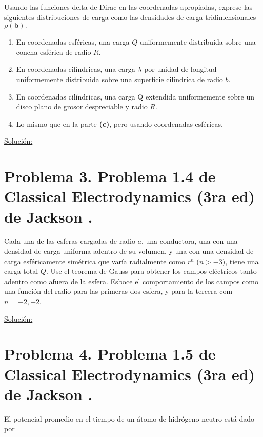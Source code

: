 \documentclass[a4paper,10pt]{article}
\numberwithin{equation}{section}
\begin{document}
Usando las funciones delta de Dirac en las coordenadas apropiadas, exprese las 
siguientes distribuciones de carga como las densidades de carga tridimensionales 
$\rho(\mathbf{b}).$

\begin{enumerate}[label=\textbf{(\alph*)}]
 \item En coordenadas esféricas, una carga $Q$ uniformemente distribuida sobre 
 una concha esférica de radio $R$.
 \item En coordenadas cilíndricas, una carga $\lambda$ por unidad de longitud 
 uniformemente distribuida sobre una superficie cilíndrica de radio $b$.
 \item En coordenadas cilíndricas, una carga Q extendida uniformemente sobre 
 un disco plano de grosor despreciable y radio $R$.
 \item Lo mismo que en la parte \textbf{(c)}, pero usando coordenadas esféricas.
\end{enumerate}

\vspace{.3cm}

\underline{Solución:} \vspace{.3cm}

\section{Problema 3. Problema 1.4 de Classical Electrodynamics (3ra ed) de 
Jackson \cite{jackson}.}

Cada una de las esferas cargadas de radio $a$, una conductora, una con una densidad 
de carga uniforma adentro de su volumen, y una con una densidad de carga esféricamente 
simétrica que varía radialmente como $r^n$ ($n > -3)$, tiene una carga total $Q$. 
Use el teorema de Gauss para obtener los campos eléctricos tanto adentro como afuera 
de la esfera. Esboce el comportamiento de los campos como una función del radio 
para las primeras dos esfera, y para la tercera com $n= -2,+2$. 

\vspace{.3cm}

\underline{Solución:} \vspace{.3cm}

\section{Problema 4. Problema 1.5 de Classical Electrodynamics (3ra ed) de 
Jackson \cite{jackson}.}

El potencial promedio en el tiempo de un átomo de hidrógeno neutro está dado por 
\end{document}
